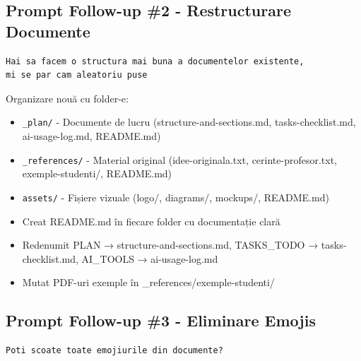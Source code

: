 \documentclass[11pt,a4paper]{article}
\begin{document}
\subsection{Prompt Follow-up \#2 - Restructurare Documente}

\begin{tcolorbox}[colback=promptbackground,colframe=blue!75!black,title=Prompt Input]
\begin{verbatim}
Hai sa facem o structura mai buna a documentelor existente,
mi se par cam aleatoriu puse
\end{verbatim}
\end{tcolorbox}

\begin{tcolorbox}[colback=outputbackground,colframe=green!75!black,title=Output Generat]
Organizare nouă cu folder-e:
\begin{itemize}[leftmargin=*]
    \item \texttt{\_plan/} - Documente de lucru (structure-and-sections.md, tasks-checklist.md, ai-usage-log.md, README.md)
    \item \texttt{\_references/} - Material original (idee-originala.txt, cerinte-profesor.txt, exemple-studenti/, README.md)
    \item \texttt{assets/} - Fișiere vizuale (logo/, diagrams/, mockups/, README.md)
    \item Creat README.md în fiecare folder cu documentație clară
    \item Redenumit PLAN → structure-and-sections.md, TASKS\_TODO → tasks-checklist.md, AI\_TOOLS → ai-usage-log.md
    \item Mutat PDF-uri exemple în \_references/exemple-studenti/
\end{itemize}
\end{tcolorbox}

\subsection{Prompt Follow-up \#3 - Eliminare Emojis}

\begin{tcolorbox}[colback=promptbackground,colframe=blue!75!black,title=Prompt Input]
\begin{verbatim}
Poti scoate toate emojiurile din documente?
\end{verbatim}
\end{tcolorbox}
\end{document}
